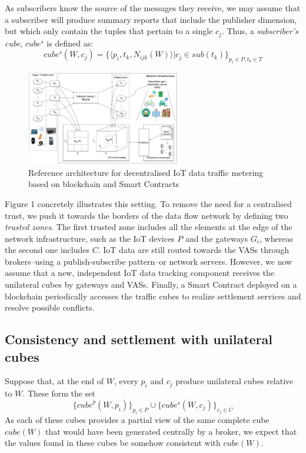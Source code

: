 \documentclass[chi_draft]{sigchi}
\begin{document}
As subscribers know the source of the messages they receive, we may assume that a subscriber will produce summary reports that include the publisher dimension, but which only contain the tuples that pertain to a single $c_j$. Thus, a \textit{subscriber's cube}, $ \mathit{cube^s} $ is defined as:
\[
\mathit{cube^s}(W, c_j)  =  \{ \langle p_i, t_k, N_{ijk}(W) \rangle | c_j \in \mathit{sub}(t_k)\}_{p_i \in P, t_k \in T}
\]

\begin{figure}[!ht]
	\centering
	\includegraphics[width=0.6\textwidth]{figures/IoT-tracking-arch-2}
	\caption{Reference architecture for decentralised IoT data traffic metering based on blockchain and Smart Contracts}
	\label{fig:iot-tracking-arch-2}
\end{figure}

Figure 1 concretely illustrates this setting. To remove the need for a centralised trust, we push it towards the borders of the data flow network by defining two \textit{trusted zones}.
The first trusted zone includes all the elements at the edge of the network infrastructure, such as the IoT devices $P$ and the gateways $ G_i $, whereas the second one includes $ C $.
IoT data are still routed towards the VASs through brokers--using a publish-subscribe pattern--or network servers.
However, we now assume that a new, independent IoT data tracking component receives the unilateral cubes by gateways and VASs.
Finally, a Smart Contract deployed on a blockchain periodically accesses the traffic cubes to realize settlement services and resolve possible conflicts.

\subsection{Consistency and settlement with unilateral cubes}

Suppose that, at the end of $W$, every $p_i$ and $c_j$ produce  unilateral cubes relative to $W$. 
These form the set
\begin{equation}\label{eq:all-cubes}
\{ \mathit{cube}^p(W, p_i) \}_{p_i \in P}\cup \{\mathit{cube^s}(W, c_j) \}_{c_j \in C} 
\end{equation}
As each of these cubes provides a partial view of the same complete cube $ \mathit{cube}(W) $ that would have been generated centrally by a broker, we expect that the values found in these cubes be somehow consistent with $ \mathit{cube}(W) $.
\end{document}
